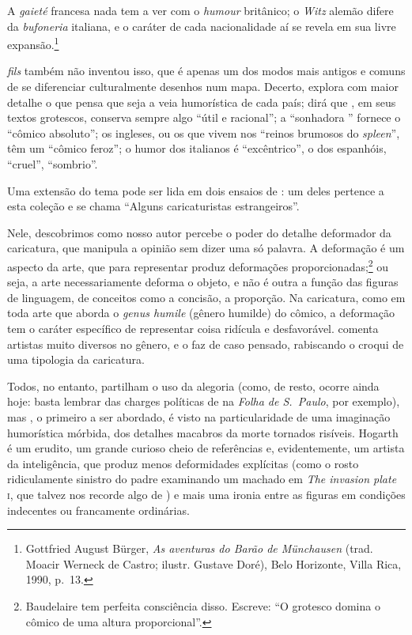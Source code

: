 \begin{hedraquote}
A \textit{gaieté} francesa nada tem a ver com o \textit{humour}
britânico; o \textit{Witz} alemão difere da \textit{bufoneria}
italiana, e o caráter de cada nacionalidade aí se revela em sua livre
expansão.\footnote{ Gottfried August Bürger, \textit{As aventuras do
Barão de Münchausen} (trad. Moacir Werneck de Castro; ilustr. 
Gustave Doré), Belo Horizonte, Villa Rica, 1990, p.~13.}		
\end{hedraquote}

 \textit{fils} também não inventou isso, que é apenas
um dos modos mais antigos e comuns de se diferenciar culturalmente
desenhos num mapa. Decerto,  explora com maior detalhe o que
pensa que seja a veia humorística de cada país; dirá que , em
seus textos grotescos, conserva sempre algo “útil e racional”; a
“sonhadora ” fornece o “cômico absoluto”; os ingleses, ou os
que vivem nos “reinos brumosos do \textit{spleen}”, têm um “cômico feroz”; o
humor dos italianos é “excêntrico”, o dos espanhóis, “cruel”,
“sombrio”.

Uma extensão do tema pode ser lida em dois ensaios de : um
deles pertence a esta coleção e se chama “Alguns caricaturistas
estrangeiros”.

Nele, descobrimos como nosso autor percebe o poder do detalhe deformador
da caricatura, que manipula a opinião sem dizer uma só palavra. A
deformação é um aspecto da arte, que para representar produz
deformações proporcionadas;\footnote{ Baudelaire tem perfeita
consciência disso. Escreve: “O grotesco domina o cômico de uma altura
proporcional”.} ou seja, a arte necessariamente deforma o objeto, e
não é outra a função das figuras de linguagem, de conceitos como a
concisão, a proporção. Na caricatura, como em toda arte que aborda o
\textit{genus humile} (gênero humilde) do cômico, a deformação tem o
caráter específico de representar coisa ridícula e desfavorável.
 comenta artistas muito diversos no gênero, e o faz de caso
pensado, rabiscando o croqui de uma tipologia da caricatura.

Todos, no entanto, partilham o uso da alegoria (como, de resto, ocorre
ainda hoje: basta lembrar das charges políticas de  na
\textit{Folha de S.~Paulo}, por exemplo), mas , o
primeiro a ser abordado, é visto na particularidade de uma imaginação
humorística mórbida, dos detalhes macabros da morte tornados risíveis.
Hogarth é um erudito, um grande curioso cheio de referências e,
evidentemente, um artista da inteligência, que produz menos
deformidades explícitas (como o rosto ridiculamente sinistro do padre
examinando um machado em \textit{The invasion plate} \textsc{i}, que talvez nos
recorde algo de ) e mais uma ironia entre as figuras em condições
indecentes ou francamente ordinárias.

